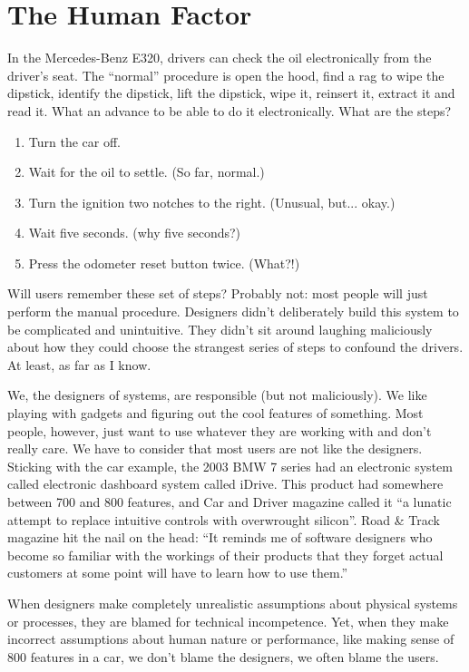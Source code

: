 \section*{The Human Factor}
In the Mercedes-Benz E320, drivers can check the oil electronically from the driver's seat. The ``normal'' procedure is open the hood, find a rag to wipe the dipstick, identify the dipstick, lift the dipstick, wipe it, reinsert it, extract it and read it. What an advance to be able to do it electronically. What are the steps?

\begin{enumerate}
	\item Turn the car off.
	\item Wait for the oil to settle. (So far, normal.)
	\item Turn the ignition two notches to the right. (Unusual, but... okay.)
	\item Wait five seconds. (why five seconds?)
	\item Press the odometer reset button twice. (What?!)
\end{enumerate}

Will users remember these set of steps? Probably not: most people will just perform the manual procedure. Designers didn't deliberately build this system to be complicated and unintuitive. They didn't sit around laughing maliciously about how they could choose the strangest series of steps to confound the drivers. At least, as far as I know.

We, the designers of systems, are responsible (but not maliciously). We like playing with gadgets and figuring out the cool features of something. Most people, however, just want to use whatever they are working with and don't really care. We have to consider that most users are not like the designers. Sticking with the car example, the 2003 BMW 7 series had an electronic system called electronic dashboard system called iDrive. This product had somewhere between 700 and 800 features, and Car and Driver magazine called it ``a lunatic attempt to replace intuitive controls with overwrought silicon''. Road \& Track magazine hit the nail on the head: ``It reminds me of software designers who become so familiar with the workings of their products that they forget actual customers at some point will have to learn how to use them.''

When designers make completely unrealistic assumptions about physical systems or processes, they are blamed for technical incompetence. Yet, when they make incorrect assumptions about human nature or performance, like making sense of 800 features in a car, we don't blame the designers, we often blame the users.




